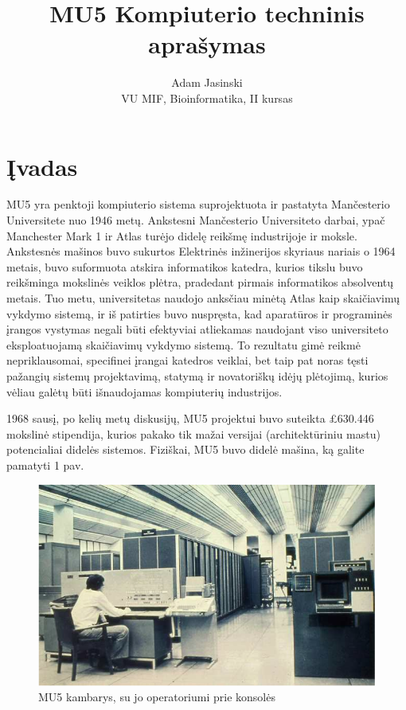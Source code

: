 \documentclass[a4paper,lithuanian]{article}
\title{MU5 Kompiuterio techninis aprašymas}
\author{
  Adam Jasinski\\
  VU MIF, Bioinformatika, II kursas
}
\begin{document}
\maketitle

\newpage

\section{Įvadas}

MU5 yra penktoji kompiuterio sistema suprojektuota ir pastatyta Mančesterio Universitete nuo 1946 metų. Ankstesni Mančesterio Universiteto darbai, ypač \\Manchester Mark 1 ir Atlas turėjo didelę reikšmę industrijoje ir moksle. Ankstesnės mašinos buvo sukurtos Elektrinės inžinerijos skyriaus nariais o 1964 metais, buvo suformuota atskira informatikos katedra, kurios tikslu buvo reikšminga mokslinės veiklos plėtra, pradedant pirmais informatikos absolventų metais. Tuo metu, universitetas naudojo anksčiau minėtą Atlas kaip skaičiavimų vykdymo sistemą, ir iš patirties buvo nuspręsta, kad aparatūros ir programinės įrangos vystymas negali būti efektyviai atliekamas naudojant viso universiteto eksploatuojamą skaičiavimų vykdymo sistemą. To rezultatu gimė reikmė nepriklausomai, specifinei įrangai katedros veiklai, bet taip pat noras tęsti pažangių sistemų projektavimą, statymą ir novatoriškų idėjų plėtojimą, kurios vėliau galėtų būti išnaudojamas kompiuterių industrijos.\newline

1968 sausį, po kelių metų diskusijų, MU5 projektui buvo suteikta £630.446 mokslinė stipendija, kurios pakako tik mažai versijai (architektūriniu mastu) potencialiai didelės sistemos. Fiziškai, MU5 buvo didelė mašina, ką galite pamatyti 1 pav.\newline



\begin{figure}[h]
	\includegraphics[scale=0.4]{mu5-room}
	\centering
	\caption{MU5 kambarys, su jo operatoriumi prie konsolės}
	\label{}
\end{figure}
\end{document}
